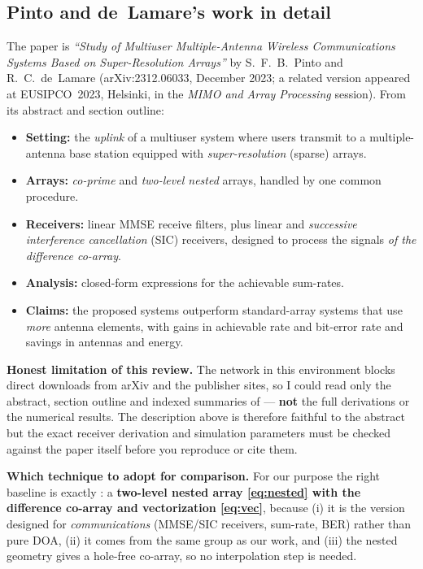 \documentclass[11pt]{article}
\begin{document}
\subsection{Pinto and de~Lamare's work in detail}
The paper is \emph{``Study of Multiuser Multiple-Antenna Wireless Communications Systems Based on
Super-Resolution Arrays''} by S.~F.~B.~Pinto and R.~C.~de~Lamare \cite{pinto2023sra} (arXiv:2312.06033,
December 2023; a related version appeared at EUSIPCO~2023, Helsinki, in the \emph{MIMO and Array
Processing} session). From its abstract and section outline:
\begin{itemize}[leftmargin=1.4em,itemsep=1pt]
\item \textbf{Setting:} the \emph{uplink} of a multiuser system where users transmit to a
      multiple-antenna base station equipped with \emph{super-resolution} (sparse) arrays.
\item \textbf{Arrays:} \emph{co-prime} and \emph{two-level nested} arrays, handled by one common
      procedure.
\item \textbf{Receivers:} linear MMSE receive filters, plus linear and \emph{successive interference
      cancellation} (SIC) receivers, designed to process the signals \emph{of the difference
      co-array}.
\item \textbf{Analysis:} closed-form expressions for the achievable sum-rates.
\item \textbf{Claims:} the proposed systems outperform standard-array systems that use \emph{more}
      antenna elements, with gains in achievable rate and bit-error rate and savings in antennas and
      energy.
\end{itemize}

\begin{warnbox}
\textbf{Honest limitation of this review.} The network in this environment blocks direct downloads
from arXiv and the publisher sites, so I could read only the abstract, section outline and indexed
summaries of \cite{pinto2023sra} --- \textbf{not} the full derivations or the numerical results.
The description above is therefore faithful to the abstract but the exact receiver derivation and
simulation parameters must be checked against the paper itself before you reproduce or cite them.
\end{warnbox}

\textbf{Which technique to adopt for comparison.} For our purpose the right baseline is exactly
\cite{pinto2023sra}: a \textbf{two-level nested array \eqref{eq:nested} with the difference co-array
and vectorization \eqref{eq:vec}}, because (i) it is the version designed for \emph{communications}
(MMSE/SIC receivers, sum-rate, BER) rather than pure DOA, (ii) it comes from the same group as our
work, and (iii) the nested geometry gives a hole-free co-array, so no interpolation step is needed.
\end{document}
